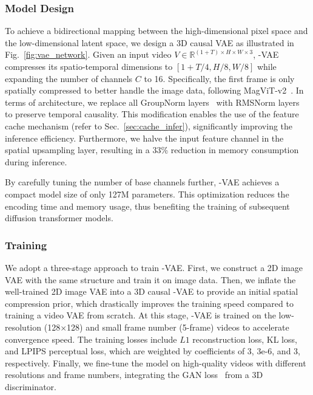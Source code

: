 \subsubsection{Model Design}

To achieve a bidirectional mapping between the high-dimensional pixel space and the low-dimensional latent space, we design a 3D causal VAE as illustrated in Fig.~\ref{fig:vae_network}. 
Given an input video $V\in \mathbb{R}^{(1+T) \times H \times W \times 3}$, \method-VAE compresses its spatio-temporal dimensions to $[1+T/4, H/8, W/8]$ while expanding the number of channels $C$ to 16.
Specifically, the first frame is only spatially compressed to better handle the image data, following MagViT-v2~\citep{yu2023language}.
In terms of architecture, we replace all GroupNorm layers~\citep{wu2018group} with RMSNorm layers~\citep{rms} to preserve temporal causality.
This modification enables the use of the feature cache mechanism (refer to Sec.~\ref{sec:cache_infer}), significantly improving the inference efficiency.
Furthermore, we halve the input feature channel in the spatial upsampling layer, resulting in a 33\% reduction in memory consumption during inference.

By carefully tuning the number of base channels further, \method-VAE achieves a compact model size of only 127M parameters. 
This optimization reduces the encoding time and memory usage, thus benefiting the training of subsequent diffusion transformer models.

\subsubsection{Training}

We adopt a three-stage approach to train \method-VAE. 
First, we construct a 2D image VAE with the same structure and train it on image data. Then, we inflate the well-trained 2D image VAE into a 3D causal \method-VAE to provide an initial spatial compression prior, which drastically improves the training speed compared to training a video VAE from scratch. 
At this stage, \method-VAE is trained on the low-resolution (128$\times$128) and small frame number (5-frame) videos to accelerate convergence speed. 
The training losses include $L1$ reconstruction loss, KL loss, and LPIPS perceptual loss, which are weighted by coefficients of 3, 3e-6, and 3, respectively.
Finally, we fine-tune the model on high-quality videos with different resolutions and frame numbers, integrating the GAN loss~\citep{esser2020taming} from a 3D discriminator. 
 

